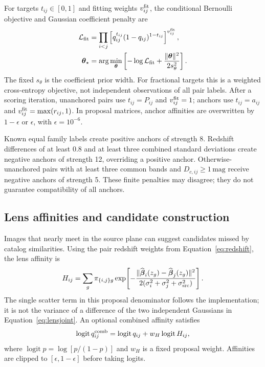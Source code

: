 \documentclass[twocolumn,twocolappendix,linenumbers]{aastex701}
\newcommand{\logit}{\operatorname{logit}}
\begin{document}
For targets $t_{ij}\in[0,1]$ and fitting weights $v_{ij}^{\rm fit}$, the conditional Bernoulli objective and Gaussian coefficient penalty are
\begin{equation}
 \begin{aligned}
 \mathcal L_{\rm fit}&=\prod_{i<j}
   \left[q_{ij}^{t_{ij}}(1-q_{ij})^{1-t_{ij}}\right]^{v_{ij}^{\rm fit}},\\
 \boldsymbol\theta_\star
 &=\arg\min_{\boldsymbol\theta}
   \left[-\log\mathcal L_{\rm fit}
         +\frac{\|\boldsymbol\theta\|^2}{2s_\theta^2}\right].
 \end{aligned}
 \label{eq:fit}
\end{equation}
The fixed $s_\theta$ is the coefficient prior width.
For fractional targets this is a weighted cross-entropy objective, not independent observations of all pair labels.
After a scoring iteration, unanchored pairs use $t_{ij}=P_{ij}$ and $v_{ij}^{\rm fit}=1$; anchors use $t_{ij}=a_{ij}$ and $v_{ij}^{\rm fit}=\max(r_{ij},1)$.
In proposal matrices, anchor affinities are overwritten by $1-\epsilon$ or $\epsilon$, with $\epsilon=10^{-6}$.

Known equal family labels create positive anchors of strength 8.
Redshift differences of at least 0.8 and at least three combined standard deviations create negative anchors of strength 12, overriding a positive anchor.
Otherwise-unanchored pairs with at least three common bands and $D_{c,ij}\geq1\,\mathrm{mag}$ receive negative anchors of strength 5.
These finite penalties may disagree; they do not guarantee compatibility of all anchors.

\subsection{Lens affinities and candidate construction}
Images that nearly meet in the source plane can suggest candidates missed by catalog similarities.
Using the pair redshift weights from Equation~\ref{eq:redshift}, the lens affinity is
\begin{equation}
 H_{ij}=\sum_g\pi_{\{i,j\}g}
 \exp\!\left[-\frac{\|\widehat{\boldsymbol\beta}_i(z_g)
                    -\widehat{\boldsymbol\beta}_j(z_g)\|^2}
 {2(\sigma_i^2+\sigma_j^2+\sigma_{\rm src}^2)}\right].
 \label{eq:lensaffinity}
\end{equation}
The single scatter term in this proposal denominator follows the implementation; it is not the variance of a difference of the two independent Gaussians in Equation~\ref{eq:lensjoint}.
An optional combined affinity satisfies
\begin{equation}
 \logit q_{ij}^{\rm comb}=\logit q_{ij}
                          +w_H\logit H_{ij},
 \label{eq:combinedaffinity}
\end{equation}
where $\logit p=\log[p/(1-p)]$ and $w_H$ is a fixed proposal weight.
Affinities are clipped to $[\epsilon,1-\epsilon]$ before taking logits.
\end{document}
